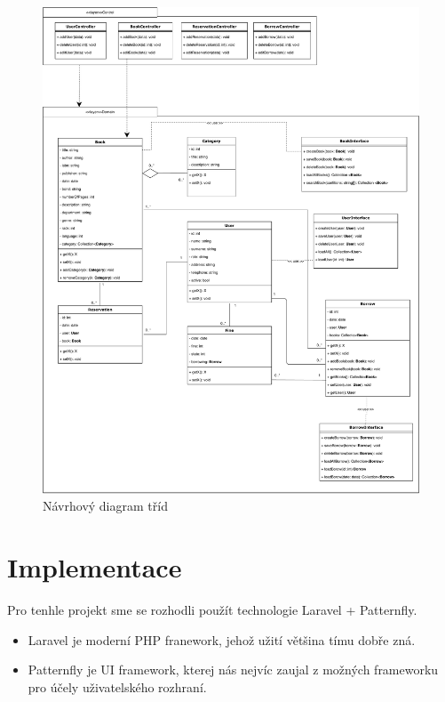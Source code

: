 \documentclass[11pt, a4paper, titlepage]{article}
\begin{document}
	\begin{figure}[H]
		\centering
        \includegraphics[width=1.0\textwidth]{./assets/classdiagram/KDM.pdf}
		\caption{Návrhový diagram tříd}
	\end{figure}

	\newpage
	\section*{Implementace}
	Pro tenhle projekt sme se rozhodli použít technologie Laravel + Patternfly.
	\begin{itemize}
	    \item Laravel je moderní PHP franework, jehož užití většina tímu dobře zná.
	    \item Patternfly je UI framework, kterej nás nejvíc zaujal z možných frameworku pro účely uživatelského rozhraní.
	\end{itemize}{}
\end{document}
